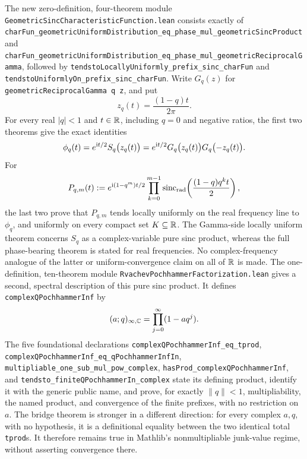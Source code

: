 \documentclass[11pt,oneside]{article}
\theoremstyle{definition}
\theoremstyle{remark}
\begin{document}
The new zero-definition, four-theorem module
\nolinkurl{GeometricSincCharacteristicFunction.lean} consists exactly of
\nolinkurl{charFun_geometricUniformDistribution_eq_phase_mul_geometricSincProduct} and
\nolinkurl{charFun_geometricUniformDistribution_eq_phase_mul_geometricReciprocalGamma},
followed by \nolinkurl{tendstoLocallyUniformly_prefix_sinc_charFun} and
\nolinkurl{tendstoUniformlyOn_prefix_sinc_charFun}.
Write \(G_q(z)\) for \nolinkurl{geometricReciprocalGamma q z}, and put
\[
 z_q(t)=\frac{(1-q)t}{2\pi}.
\]
For every real \(\lvert q\rvert<1\) and \(t\in\mathbb{R}\), including \(q=0\) and negative
ratios, the first two theorems give the exact identities
\[
 \phi_q(t)=e^{\mathrm{i} t/2}S_q\bigl(z_q(t)\bigr)
 =e^{\mathrm{i} t/2}G_q\bigl(z_q(t)\bigr)G_q\bigl(-z_q(t)\bigr).
\]
For
\[
 P_{q,m}(t):=e^{\mathrm{i}(1-q^m)t/2}
   \prod_{k=0}^{m-1}\operatorname{sinc}_{\mathrm{rad}}
      \!\left(\frac{(1-q)q^kt}{2}\right),
\]
the last two prove that \(P_{q,m}\) tends locally uniformly on the real frequency line
to \(\phi_q\), and uniformly on every compact set \(K\subseteq\mathbb{R}\).  The Gamma-side
locally uniform theorem concerns \(S_q\) as a complex-variable pure sinc product, whereas
the full phase-bearing theorem is stated for real frequencies.  No complex-frequency
analogue of the latter or uniform-convergence claim on all of \(\mathbb{R}\) is made.
The one-definition, ten-theorem module
\nolinkurl{RvachevPochhammerFactorization.lean} gives a second, spectral
description of this pure sinc product.  It defines
\nolinkurl{complexQPochhammerInf} by
\[
 (a;q)_{\infty,\mathbb{C}}=\prod_{j=0}^{\infty}(1-aq^j).
\]
The five foundational declarations
\nolinkurl{complexQPochhammerInf_eq_tprod},
\nolinkurl{complexQPochhammerInf_eq_qPochhammerInfIn},
\nolinkurl{multipliable_one_sub_mul_pow_complex},
\nolinkurl{hasProd_complexQPochhammerInf}, and
\nolinkurl{tendsto_finiteQPochhammerIn_complex}
state its defining product, identify it with the generic public name, and
prove, for exactly \(\lVert q\rVert<1\), multipliability, the named product,
and convergence of the finite prefixes, with no restriction on \(a\).  The
bridge theorem is stronger in a different direction: for every complex
\(a,q\), with no hypothesis, it is a definitional equality between the two
identical total \texttt{tprod}s.  It therefore remains true in Mathlib's
nonmultipliable junk-value regime, without asserting convergence there.
\end{document}
